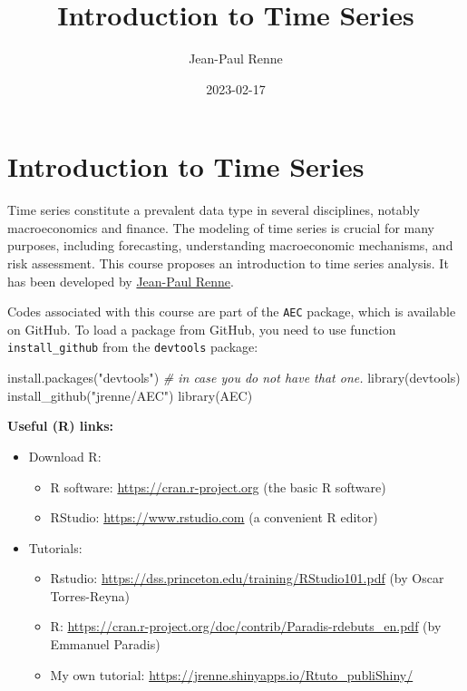 \documentclass[
  12pt,
]{book}
\title{Introduction to Time Series}
\author{Jean-Paul Renne}
\date{2023-02-17}
\newenvironment{Shaded}{\begin{snugshade}}{\end{snugshade}}
\newcommand{\CommentTok}[1]{\textcolor[rgb]{0.56,0.35,0.01}{\textit{#1}}}
\newcommand{\FunctionTok}[1]{\textcolor[rgb]{0.00,0.00,0.00}{#1}}
\newcommand{\NormalTok}[1]{#1}
\newcommand{\StringTok}[1]{\textcolor[rgb]{0.31,0.60,0.02}{#1}}
\providecommand{\tightlist}{%
  \setlength{\itemsep}{0pt}\setlength{\parskip}{0pt}}
\theoremstyle{definition}
\theoremstyle{definition}
\theoremstyle{definition}
\theoremstyle{definition}
\theoremstyle{remark}
\begin{document}
\maketitle

{
\setcounter{tocdepth}{1}
\tableofcontents
}
\newcommand{\bv}[1]{\mathbf{#1}}

\hypertarget{intro}{%
\chapter*{Introduction to Time Series}\label{intro}}

Time series constitute a prevalent data type in several disciplines, notably macroeconomics and finance. The modeling of time series is crucial for many purposes, including forecasting, understanding macroeconomic mechanisms, and risk assessment. This course proposes an introduction to time series analysis. It has been developed by \href{https://sites.google.com/site/jeanpaulrenne/home}{Jean-Paul Renne}.

Codes associated with this course are part of the \texttt{AEC} package, which is available on GitHub. To load a package from GitHub, you need to use function \texttt{install\_github} from the \texttt{devtools} package:

\begin{Shaded}
\begin{Highlighting}[]
\FunctionTok{install.packages}\NormalTok{(}\StringTok{"devtools"}\NormalTok{) }\CommentTok{\# in case you do not have that one.}
\FunctionTok{library}\NormalTok{(devtools)}
\FunctionTok{install\_github}\NormalTok{(}\StringTok{"jrenne/AEC"}\NormalTok{)}
\FunctionTok{library}\NormalTok{(AEC)}
\end{Highlighting}
\end{Shaded}

\textbf{Useful (R) links:}

\begin{itemize}
\item
  Download R:

  \begin{itemize}
  \tightlist
  \item
    R software: \url{https://cran.r-project.org} (the basic R software)
  \item
    RStudio: \url{https://www.rstudio.com} (a convenient R editor)
  \end{itemize}
\item
  Tutorials:

  \begin{itemize}
  \tightlist
  \item
    Rstudio: \url{https://dss.princeton.edu/training/RStudio101.pdf} (by Oscar Torres-Reyna)
  \item
    R: \url{https://cran.r-project.org/doc/contrib/Paradis-rdebuts_en.pdf} (by Emmanuel Paradis)
  \item
    My own tutorial: \url{https://jrenne.shinyapps.io/Rtuto_publiShiny/}
  \end{itemize}
\end{itemize}
\end{document}
